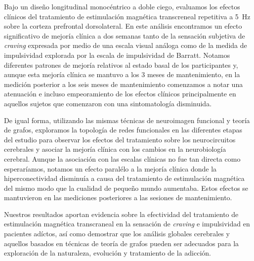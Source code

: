 Bajo un diseño longitudinal monocéntrico a doble ciego, evaluamos los efectos clínicos del tratamiento de estimulación magnética transcreneal repetitiva a \SI{5}{\hertz} sobre la corteza prefrontal dorsolateral. En este análisis encontramos un efecto significativo de mejoría clínica a dos semanas tanto de la sensación subjetiva de \textit{craving} expresada por medio de una escala visual análoga como de la medida de impulsividad explorada por la escala de impulsividad de Barratt. Notamos diferentes patrones de mejoría relativos al estado basal de los participantes y, aunque esta mejoría clínica se mantuvo a los 3 meses de mantenimiento, en la medición posterior a los seis meses de mantenimiento comenzamos a notar una atenuación e incluso empeoramiento de los efectos clínicos principalmente en aquellos sujetos que comenzaron con una sintomatología disminuida. \par
De igual forma, utilizando las mismas técnicas de neuroimagen funcional y teoría de grafos, exploramos la topología de redes funcionales en las diferentes etapas del estudio para observar los efectos del tratamiento sobre los neurocircuitos cerebrales y asociar la mejoría clínica con los cambios en la neurobiología cerebral. Aunque la asociación con las escalas clínicas no fue tan directa como esperaríamos, notamos un efecto paralélo a la mejoría clínica donde la hiperconectividad disminuía a causa del tratamiento de estimulación magnética del mismo modo que la cualidad de pequeño mundo aumentaba. Estos efectos se mantuvieron en las mediciones posteriores a las sesiones de mantenimiento. \par
Nuestros resultados aportan evidencia sobre la efectividad del tratamiento de estimulación magnética transcraneal en la sensación de \textit{craving} e impulsividad en pacientes adíctos, así como demostrar que los análisis globales cerebrales y aquellos basados en técnicas de teoría de grafos pueden ser adecuados para la exploración de la naturaleza, evolución y tratamiento de la adicción.

